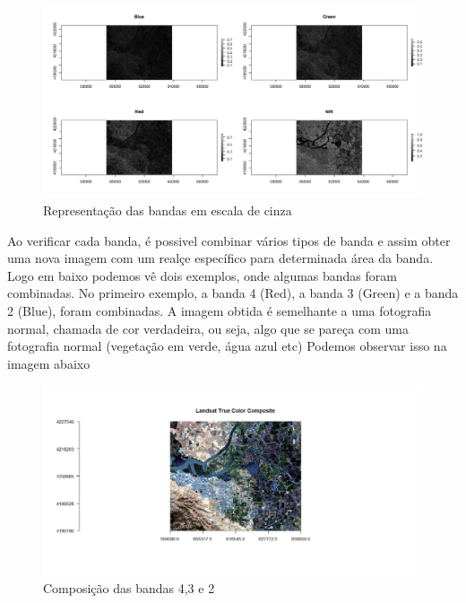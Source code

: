 \documentclass[a4paper,12pt]{article}
\begin{document}
\begin{center}
\begin{figure}[H]
    \centering
    \includegraphics[width = 1 \textwidth]{banda pretobranco.jpeg}
    \caption{Representação das bandas em escala de cinza}
\end{figure}    
\end{center}


Ao verificar cada banda, é possivel combinar vários tipos de banda e assim obter uma nova imagem com um realçe específico para determinada área da banda.\newline
Logo em baixo podemos vê dois exemplos, onde algumas bandas foram combinadas. No primeiro exemplo, a banda 4 (Red), a banda 3 (Green) e a banda 2 (Blue), foram combinadas.\newline
A imagem obtida é semelhante a uma fotografia normal, chamada de cor verdadeira, ou seja, algo que se pareça com uma fotografia normal (vegetação em verde, água azul etc) Podemos observar isso na imagem abaixo

\begin{center}
\begin{figure}[H]
    \centering
    \includegraphics[width = 1 \textwidth]{comp 432.jpeg}
    \caption{Composição das bandas 4,3 e 2}
\end{figure}    
\end{center}
\end{document}
